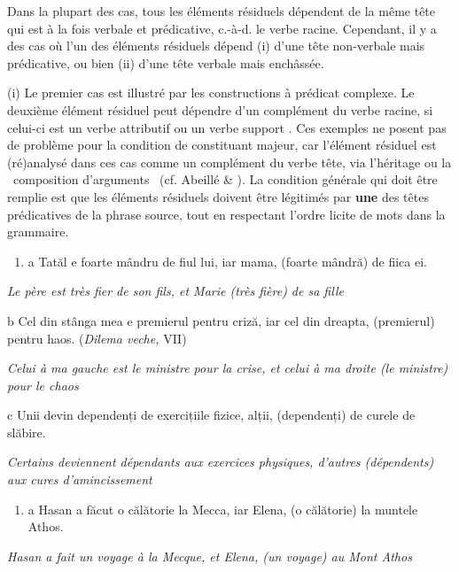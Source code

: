 Dans la plupart des cas, tous les éléments résiduels dépendent de la même tête qui est à la fois verbale et prédicative, c.-à-d. le verbe racine. Cependant, il y a des cas où l'un des éléments résiduels dépend (i) d'une tête non-verbale mais prédicative, ou bien (ii) d'une tête verbale mais enchâssée. 

(i) Le premier cas est illustré par les constructions à prédicat complexe. Le deuxième élément résiduel peut dépendre d'un complément du verbe racine, si celui-ci est un verbe attributif  ou un verbe support . Ces exemples ne posent pas de problème pour la condition de constituant majeur, car l'élément résiduel est (ré)analysé dans ces cas comme un complément du verbe tête, via l'héritage ou la {\guillemotleft}~composition d'arguments~{\guillemotright} (cf. Abeillé \& \citet{Godard2003}). La condition générale qui doit être remplie est que les éléments résiduels doivent être légitimés par \textbf{une} des têtes prédicatives de la phrase source, tout en respectant l'ordre licite de mots dans la grammaire.


\begin{enumerate}
\item \label{bkm:Ref288745854}a  Tatăl e foarte mândru de fiul lui, iar mama, (foarte mândră) de fiica ei.


\end{enumerate}
{\itshape
Le père est très fier de son fils, et Marie (très fière) de sa fille  } 

  b  Cel din stânga mea e premierul pentru criză, iar cel din dreapta, (premierul) pentru haos. (\textit{Dilema veche,} VII)

{\itshape
Celui à ma gauche est le ministre pour la crise, et celui à ma droite (le ministre) pour le chaos}

  c  Unii devin dependenți de exercițiile fizice, alții, (dependenți) de curele de slăbire.

{\itshape
Certains deviennent dépendants aux exercices physiques, d'autres (dépendents) aux cures d'amincissement} 


\begin{enumerate}
\item \label{bkm:Ref288745870}a  Hasan a făcut o călătorie la Mecca, iar Elena, (o călătorie) la muntele Athos.


\end{enumerate}
{\itshape
Hasan a fait un voyage à la Mecque, et Elena, (un voyage) au Mont Athos  } 

